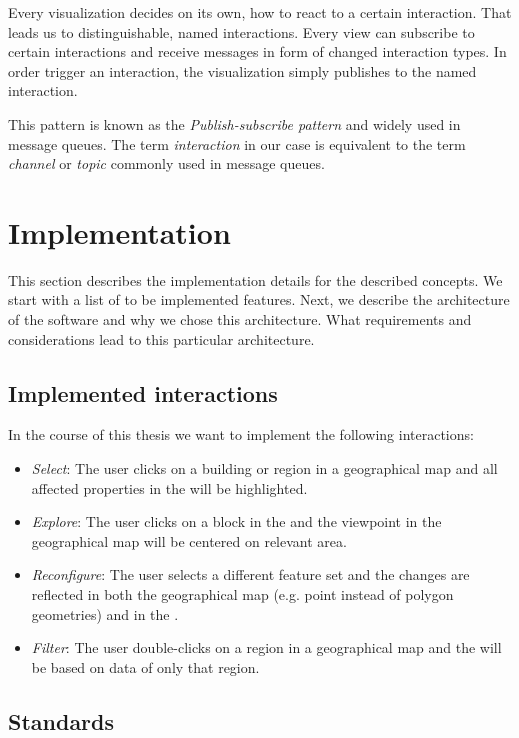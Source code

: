 Every visualization decides on its own, how to react to a certain interaction.
That leads us to distinguishable, named interactions.
Every view can subscribe to certain interactions and receive messages in form of changed interaction types.
In order trigger an interaction, the visualization simply publishes to the named interaction.

This pattern is known as the \emph{Publish-subscribe pattern} and widely used in message queues.
The term \emph{interaction} in our case is equivalent to the term \emph{channel} or \emph{topic} commonly used in message queues.


\clearpage
\section{Implementation}\label{sec:implementation}

This section describes the implementation details for the described concepts.
We start with a list of to be implemented features.
Next, we describe the architecture of the software and why we chose this architecture.
What requirements and considerations lead to this particular architecture.


\subsection{Implemented interactions}

In the course of this thesis we want to implement the following interactions:
\begin{itemize}
  \item
    \emph{Select}: The user clicks on a building or region in a geographical map and all affected properties in the \tmap{} will be highlighted.
  \item
    \emph{Explore}: The user clicks on a block in the \tmap{} and the viewpoint in the geographical map will be centered on relevant area.
  \item
    \emph{Reconfigure}: The user selects a different feature set and the changes are reflected in both the geographical map (e.g. point instead of polygon geometries) and in the \tmap{}.
  \item
    \emph{Filter}: The user double-clicks on a region in a geographical map and the \tmap{} will be based on data of only that region.
\end{itemize}

\subsection{Standards}

